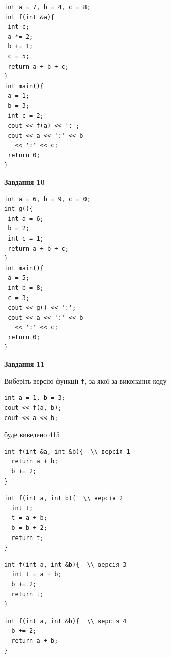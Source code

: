 \documentclass[12pt, ukrainian]{article}
\def\code#1{\Verb!#1!}
\begin{document}
{\begin {large}
\begin{minipage}[t]{7.0cm}
\begin{verbatim}
int a = 7, b = 4, c = 8;
int f(int &a){
 int c;
 a *= 2;
 b += 1;
 c = 5;
 return a + b + c;
}
int main(){
 a = 1;
 b = 3;
 int c = 2;
 cout << f(a) << ':';
 cout << a << ':' << b 
   << ':' << c;
 return 0;
}
\end{verbatim}



\begin{center}
\textbf{Завдання 10}
\end{center}
\vspace{-8mm}

\begin{verbatim}
int a = 6, b = 9, c = 0;
int g(){
 int a = 6;
 b = 2;
 int c = 1;
 return a + b + c;
}
int main(){
 a = 5;
 int b = 8;
 c = 3;
 cout << g() << ':';
 cout << a << ':' << b 
   << ':' << c;
 return 0;
}
\end{verbatim}

\end{minipage}
\vline \hspace{1mm}
\begin{minipage}[t]{11.0cm}

\begin{center}
\textbf{Завдання 11}
\end{center}
Виберіть версію функції \code{f}, за якої за виконання коду
\begin{verbatim}
int a = 1, b = 3;
cout << f(a, b);
cout << a << b;
\end{verbatim}

буде виведено 415

\begin{verbatim}
int f(int &a, int &b){  \\ версія 1
  return a + b;
  b += 2;
}
\end{verbatim}

\vspace{-8mm}\begin{verbatim}
int f(int a, int b){  \\ версія 2
  int t;
  t = a + b;
  b = b + 2;
  return t;
}
\end{verbatim}

\vspace{-8mm}\begin{verbatim}
int f(int a, int &b){  \\ версія 3
  int t = a + b;
  b += 2;
  return t;
}
\end{verbatim}

\vspace{-8mm}\begin{verbatim}
int f(int a, int &b){  \\ версія 4
  b += 2;
  return a + b;
}
\end{verbatim}




\end{minipage}
\end{large}}
\end{document}
